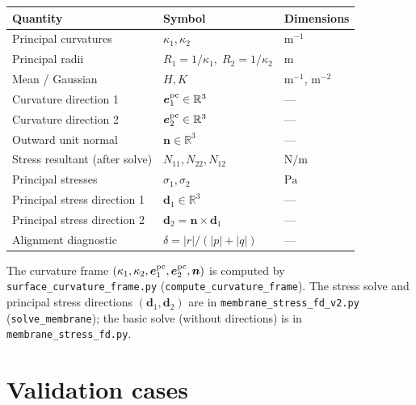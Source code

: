\documentclass[11pt]{article}
\newcommand{\vv}[1]{\bm{#1}}          %
\newcommand{\nn}{\vv{n}}               %
\newcommand{\kone}{\kappa_1}
\newcommand{\ktwo}{\kappa_2}
\newcommand{\R}{\mathbb{R}}
\begin{document}
\begin{center}
\begin{tabular}{lll}
\toprule
\textbf{Quantity} & \textbf{Symbol} & \textbf{Dimensions} \\
\midrule
Principal curvatures       & $\kone,\ktwo$                        & $\mathrm{m}^{-1}$ \\
Principal radii            & $R_1=1/\kone,\;R_2=1/\ktwo$         & $\mathrm{m}$       \\
Mean / Gaussian            & $H,K$                                & $\mathrm{m}^{-1}$, $\mathrm{m}^{-2}$ \\
Curvature direction 1      & $\vv{e}_1^{\rm pc}\in\R^3$          & ---                \\
Curvature direction 2      & $\vv{e}_2^{\rm pc}\in\R^3$          & ---                \\
Outward unit normal        & $\nn\in\R^3$                         & ---                \\
\midrule
Stress resultant (after solve) & $N_{11},N_{22},N_{12}$           & $\mathrm{N/m}$     \\
Principal stresses             & $\sigma_1,\sigma_2$               & $\mathrm{Pa}$      \\
Principal stress direction 1   & $\vv{d}_1\in\R^3$                & ---                \\
Principal stress direction 2   & $\vv{d}_2=\nn\times\vv{d}_1$     & ---                \\
Alignment diagnostic           & $\delta=|r|/(|p|+|q|)$           & ---                \\
\bottomrule
\end{tabular}
\end{center}

\noindent The curvature frame $(\kone,\ktwo,\vv{e}_1^{\rm pc},\vv{e}_2^{\rm pc},\nn)$ is
computed by \texttt{surface\_curvature\_frame.py} (\texttt{compute\_curvature\_frame}).
The stress solve and principal stress directions $(\vv{d}_1,\vv{d}_2)$ are in
\texttt{membrane\_stress\_fd\_v2.py} (\texttt{solve\_membrane}); the basic solve
(without directions) is in \texttt{membrane\_stress\_fd.py}.

\section{Validation cases}
\label{sec:validation}
\end{document}
